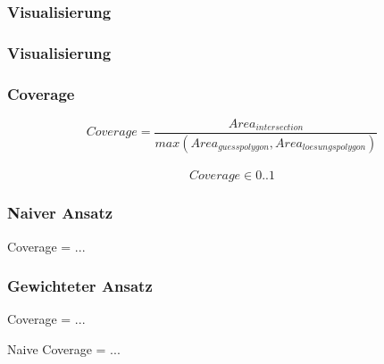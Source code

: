 \begin{frame}
  \frametitle{Visualisierung}
\end{frame}

\begin{frame}
  \frametitle{Visualisierung}
\end{frame}

\begin{frame}
  \frametitle{Coverage}
  \begin{equation*}
    Coverage = \frac{Area_{intersection}}{max(Area_{guesspolygon},Area_{loesungspolygon})}
  \end{equation*}
\\
  \begin{equation*}
    Coverage \in {0..1}
  \end{equation*}
\end{frame}

\begin{frame}
  \frametitle{Naiver Ansatz}
  \begin{center}
  \huge{Coverage = ...}
  \end{center}
\end{frame}

\begin{frame}
  \frametitle{Gewichteter Ansatz}
  \begin{center}
  \huge{Coverage = ...}
  \end{center}
  \begin{center}
  Naive Coverage = ...
  \end{center}
\end{frame}

